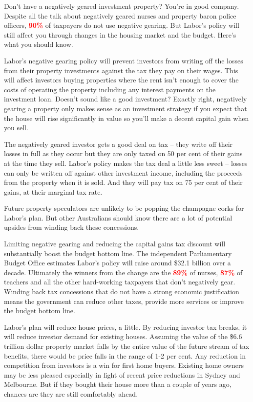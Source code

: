 \documentclass[b5paper,11pt]{article}\usepackage[]{graphicx}\usepackage[]{color}
\begin{document}
Don't have a negatively geared investment property? You're in good
company. Despite all the talk about negatively geared nurses and
property baron police officers, \textcolor{red}{\textbf{90\%}} of taxpayers do not use negative
gearing. But Labor's policy will still affect you through changes in the
housing market and the budget. Here's what you should know.

Labor's negative gearing policy will prevent investors from writing off
the losses from their property investments against the tax they pay on
their wages. This will affect investors buying properties where the rent
isn't enough to cover the costs of operating the property including any
interest payments on the investment loan. Doesn't sound like a good
investment? Exactly right, negatively gearing a property only makes
sense as an investment strategy if you expect that the house will rise
significantly in value so you'll make a decent capital gain when you
sell.

The negatively geared investor gets a good deal on tax -- they write off
their losses in full as they occur but they are only taxed on 50 per
cent of their gains at the time they sell. Labor's policy makes the tax
deal a little less sweet -- losses can only be written off against other
investment income, including the proceeds from the property when it is
sold. And they will pay tax on 75 per cent of their gains, at their
marginal tax rate.

Future property speculators are unlikely to be popping the champagne
corks for Labor's plan. But other Australians should know there are a
lot of potential upsides from winding back these concessions.

Limiting negative gearing and reducing the capital gains tax discount
will substantially boost the budget bottom line. The independent
Parliamentary Budget Office estimates Labor's policy will raise around
\$32.1 billion over a decade. Ultimately the winners from the change are
the \textcolor{red}{\textbf{89\%}} of nurses, \textcolor{red}{\textbf{87\%}} of teachers and all the other
hard-working taxpayers that don't negatively gear. Winding back tax
concessions that do not have a strong economic justification means the
government can reduce other taxes, provide more services or improve the
budget bottom line.

Labor's plan will reduce house prices, a little. By reducing investor
tax breaks, it will reduce investor demand for existing houses. Assuming
the value of the \$6.6 trillion dollar property market falls by the
entire value of the future stream of tax benefits, there would be price
falls in the range of 1-2 per cent. Any reduction in competition from
investors is a win for first home buyers. Existing home owners may be
less pleased especially in light of recent price reductions in Sydney
and Melbourne. But if they bought their house more than a couple of
years ago, chances are they are still comfortably ahead.
\end{document}
